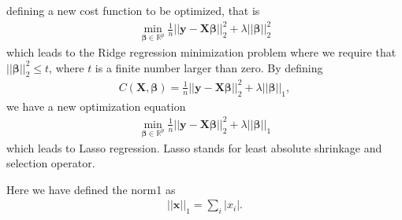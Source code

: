 \documentclass[letterpaper,10pt,english]{sphinxmanual}
\begin{document}
defining a new cost function to be optimized, that is
\begin{equation*}
\begin{split}
{\displaystyle \min_{\boldsymbol{\beta}\in
{\mathbb{R}}^{p}}}\frac{1}{n}\vert\vert \boldsymbol{y}-\boldsymbol{X}\boldsymbol{\beta}\vert\vert_2^2+\lambda\vert\vert \boldsymbol{\beta}\vert\vert_2^2
\end{split}
\end{equation*}
which leads to the Ridge regression minimization problem where we
require that \(\vert\vert \boldsymbol{\beta}\vert\vert_2^2\le t\), where \(t\) is
a finite number larger than zero. By defining
\begin{equation*}
\begin{split}
C(\boldsymbol{X},\boldsymbol{\beta})=\frac{1}{n}\vert\vert \boldsymbol{y}-\boldsymbol{X}\boldsymbol{\beta}\vert\vert_2^2+\lambda\vert\vert \boldsymbol{\beta}\vert\vert_1,
\end{split}
\end{equation*}
we have a new optimization equation
\begin{equation*}
\begin{split}
{\displaystyle \min_{\boldsymbol{\beta}\in
{\mathbb{R}}^{p}}}\frac{1}{n}\vert\vert \boldsymbol{y}-\boldsymbol{X}\boldsymbol{\beta}\vert\vert_2^2+\lambda\vert\vert \boldsymbol{\beta}\vert\vert_1
\end{split}
\end{equation*}
which leads to Lasso regression. Lasso stands for least absolute shrinkage and selection operator.

Here we have defined the norm\sphinxhyphen{}1 as
\begin{equation*}
\begin{split}
\vert\vert \boldsymbol{x}\vert\vert_1 = \sum_i \vert x_i\vert.
\end{split}
\end{equation*}
\end{document}
